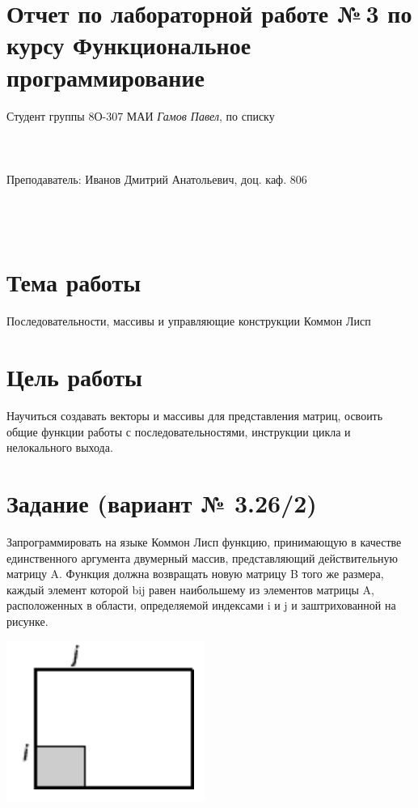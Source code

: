 \documentclass[15pt]{extarticle}
\begin{document}
\section*{Отчет по лабораторной работе №\,3
по курсу \guillemotleft  Функциональное программирование\guillemotright}

\begin{flushright}
Студент группы 8О-307 МАИ \textit{Гамов Павел},  по списку \\
 \\
 \\
\ \\
Преподаватель: Иванов Дмитрий Анатольевич, доц. каф. 806 \\
 \\
 \\
 \\

\end{flushright}

\section{Тема работы}
Последовательности, массивы и управляющие конструкции Коммон Лисп

\section{Цель работы}
Научиться создавать векторы и массивы для представления матриц, освоить общие функции работы с последовательностями, инструкции цикла и нелокального выхода.

\section{Задание (вариант № 3.26/2)}
Запрограммировать на языке Коммон Лисп функцию, принимающую в качестве единственного аргумента двумерный массив, представляющий действительную матрицу A.
Функция должна возвращать новую матрицу B того же размера, каждый элемент которой bij равен наибольшему из элементов матрицы A, расположенных в области, определяемой индексами i и j и заштрихованной на рисунке.

\includegraphics[scale=0.5]{pic}
\end{document}

